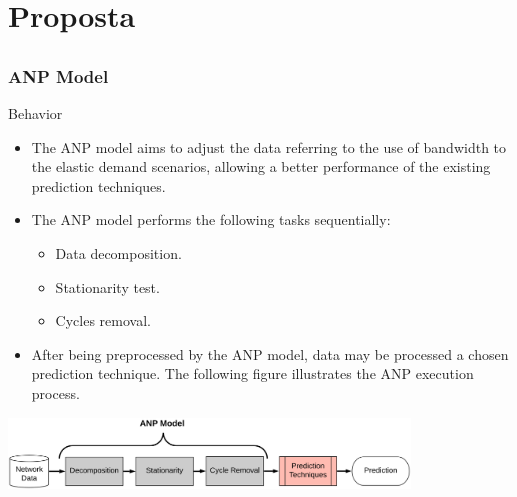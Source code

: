 \documentclass[aspectratio=169]{beamer}
\begin{document}

\section{Proposta}


\subsection{}
\begin{frame}
\frametitle{ANP Model}
\begin{block}{Behavior}
    \begin{itemize}\small
    \item The ANP model aims to adjust the data referring to the use of bandwidth to the elastic demand scenarios, allowing a better performance of the existing prediction techniques.
    \item The ANP model performs the following tasks sequentially:
    \begin{itemize}[triangle]
        \item Data decomposition.
        \item Stationarity test. 
        \item Cycles removal.
    \end{itemize}
    \item After being preprocessed by the ANP model, data may be processed a chosen prediction technique. The following figure illustrates the ANP execution process.
    \end{itemize}
\end{block}

\centering
\includegraphics[width=0.8\textwidth,angle=0]{ANPModel.png}

\end{frame}
\end{document}
